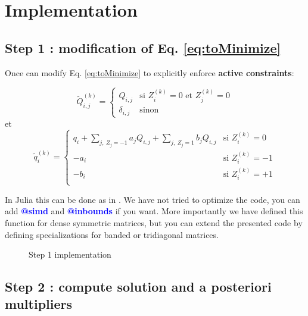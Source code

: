 \documentclass[A4]{article}
\newcommand{\link}[2]{\jumplink{#1}{\textbf{\textcolor{blue}{#2}}}}
\begin{document}
\section{Implementation}

\subsection{Step 1 : modification of Eq. \ref{eq:toMinimize}}

Once can modify Eq. \ref{eq:toMinimize} to explicitly enforce \textbf{active constraints}:

\begin{equation}
\label{Eq_Build_Qtilde}
\tilde{Q}^{(k)}_{i,j}=
\left\{
\begin{array}{rl}
  Q_{i,j} & \text{si\ }Z^{(k)}_i=0\text{\ et\ }Z^{(k)}_j=0 \\
  \delta_{i,j} & \text{sinon}  
\end{array}
\right.
\end{equation}
et
\begin{equation}
\label{Eq_Build_qtilde}
\tilde{q}^{(k)}_i=
\left\{
\begin{array}{rl}
q_i+\sum\limits_{j,\ Z_j=-1}a_jQ_{i,j} + \sum\limits_{j,\ Z_j=1}b_jQ_{i,j} & \text{si\ }Z^{(k)}_i=0 \\
-a_i & \text{si\ }Z^{(k)}_i=-1 \\
-b_i & \text{si\ }Z^{(k)}_i=+1 \\
\end{array}
\right.
\end{equation}

In Julia this can be done as in \link{lst:Modify_Qq}{Step 1
  implementation}. We have not tried to optimize the code, you can add
\textcolor{blue}{\textbf{@simd}} and \textcolor{blue}{\textbf{@inbounds}} if you
want. More importantly we have defined this function for dense
symmetric matrices, but you can extend the presented code by defining
specializations for banded or tridiagonal matrices.

\begin{figure}[ht]
  \begin{framed}
    
  \end{framed}
  \caption{Step 1 implementation}
\end{figure}

\subsection{Step 2 : compute solution and a posteriori multipliers}
\end{document}
